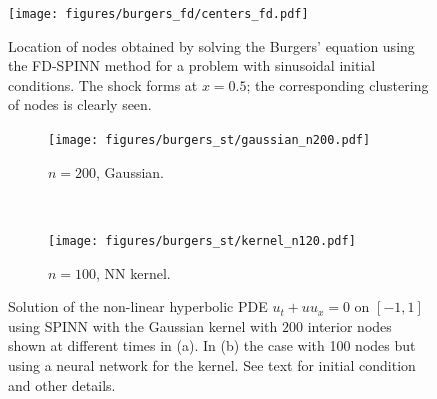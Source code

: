 \documentclass[12pt]{article}
\begin{document}
\begin{figure}
\centering
\texttt{[image: figures/burgers\_fd/centers\_fd.pdf]}
\caption{Location of nodes obtained by solving the Burgers' equation using the FD-SPINN method for a problem with sinusoidal initial conditions. The shock forms at $x=0.5$; the corresponding clustering of nodes is clearly seen.}
\label{fig:burgers_nodes}
\end{figure}

\begin{figure}
\centering
\begin{subfigure}{0.45\textwidth}
\texttt{[image: figures/burgers\_st/gaussian\_n200.pdf]}
\caption{$n = 200$, Gaussian.}
\label{fig:spinn_burgers_a}
\end{subfigure}
~
\begin{subfigure}{0.45\textwidth}
\texttt{[image: figures/burgers\_st/kernel\_n120.pdf]}
\caption{$n = 100$, NN kernel.}
\label{fig:spinn_burgers_c}
\end{subfigure}
\caption{Solution of the non-linear hyperbolic PDE $u_t + u u_x = 0$ on $[-1,1]$ using SPINN with the Gaussian kernel with $200$ interior nodes shown at different times in (a). In (b) the case with 100 nodes but using a neural network for the kernel. See text for initial condition and other details.}
\label{fig:spinn_burgers}
\end{figure}
\end{document}
